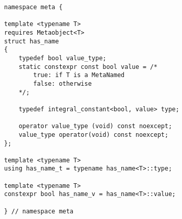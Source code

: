 
\begin{verbatim}
namespace meta {

template <typename T>
requires Metaobject<T>
struct has_name
{
	typedef bool value_type;
	static constexpr const bool value = /*
		true: if T is a MetaNamed
		false: otherwise
	*/;

	typedef integral_constant<bool, value> type;

	operator value_type (void) const noexcept;
	value_type operator(void) const noexcept;
};

template <typename T>
using has_name_t = typename has_name<T>::type;

template <typename T>
constexpr bool has_name_v = has_name<T>::value;

} // namespace meta
\end{verbatim}
